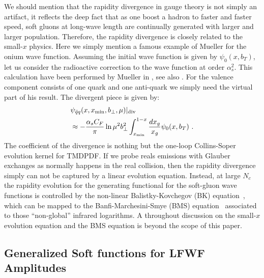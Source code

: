 \documentclass[twocolumn,superscriptaddress,longbibliography,10pt]{revtex4-1}
\begin{document}
We should mention that the rapidity divergence in gauge theory is not simply an artifact, it reflects the deep fact that as one boost a hadron to faster and faster speed, soft gluons at long-wave length are continually generated with larger and larger population. Therefore, the rapidity divergence is closely related to the small-$x$ physics.  Here we simply mention a famous example of Mueller for the onium wave function. Assuming the initial wave function is given by $\psi_0(x,b_T)$, let us consider the radioactive correction to the wave function at order $\alpha_s^2$. This calculation have been performed by Mueller in \cite{Mueller:1993rr}, see also \cite{Kovchegov:2012mbw}. For the valence component consists of one quark and one anti-quark we simply need the virtual part of his result. The divergent piece is given by:
\begin{align}
&\psi_{\bar q q}(x,x_{\rm min},b_\perp,\mu)|_{\rm div} \nonumber \\
&\approx -\frac{\alpha_sC_F}{\pi}\ln \mu^2b_\perp^2 \int^{1-x}_{x_{\rm min}} \frac{dx_g}{x_g}\psi_0(x,b_T) \ .
\end{align}
The coefficient of the divergence is nothing but the one-loop Collins-Soper evolution kernel for TMDPDF. If we probe reals emissions with Glauber exchanges as normally happens in the real collision, then the rapidity divergence simply can not be captured by a linear evolution equation. Instead, at large $N_c$ the rapidity evolution for the generating functional for the soft-gluon wave functions is controlled by the non-linear Balistky-Kovchegov (BK) equation~\cite{Balitsky:1995ub,Kovchegov:1999ua}, which can be mapped to the Banfi-Marchesini-Smye (BMS) equation~\cite{Banfi:2002hw} associated to those ``non-global'' infrared logarithms. A throughout discussion on the small-$x$ evolution equation and the BMS equation is beyond the scope of this paper.

\subsection{Generalized Soft functions for LFWF Amplitudes}
\end{document}
